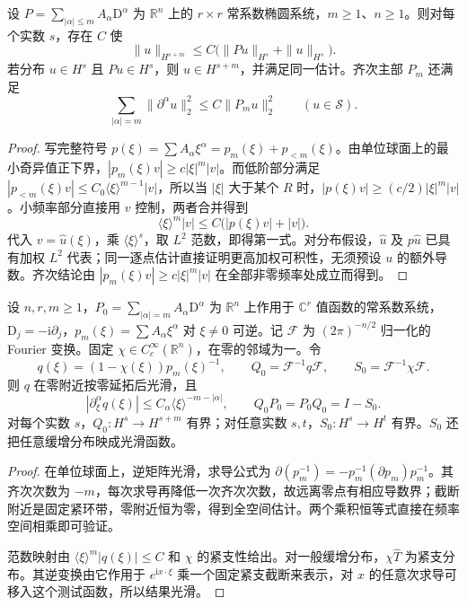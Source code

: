 \begin{theorem}\label{g3:thm:constant-elliptic-l2}
	设 \(P=\sum_{|\alpha|\le m}A_\alpha\mathrm D^\alpha\) 为 \(\mathbb R^n\) 上的 \(r\times r\) 常系数椭圆系统，\(m\ge1\)、\(n\ge1\)。则对每个实数 \(s\)，存在 \(C\) 使
	\begin{equation}\label{g3:eq:constant-elliptic-l2}
		\|u\|_{H^{s+m}}\le C\bigl(\|Pu\|_{H^s}+\|u\|_{H^s}\bigr).
	\end{equation}
	若分布 \(u\in H^s\) 且 \(Pu\in H^s\)，则 \(u\in H^{s+m}\)，并满足同一估计。齐次主部 \(P_m\) 还满足
	\[
		\sum_{|\alpha|=m}\|\partial^\alpha u\|_2^2\le C\|P_mu\|_2^2
		\qquad(u\in\mathcal S).
	\]
\end{theorem}
\begin{proof}
	写完整符号 \(p(\xi)=\sum A_\alpha\xi^\alpha=p_m(\xi)+p_{<m}(\xi)\)。由单位球面上的最小奇异值正下界，\(|p_m(\xi)v|\ge c|\xi|^m|v|\)。而低阶部分满足 \(|p_{<m}(\xi)v|\le C_0\langle\xi\rangle^{m-1}|v|\)，所以当 \(|\xi|\) 大于某个 \(R\) 时，\(|p(\xi)v|\ge(c/2)|\xi|^m|v|\)。小频率部分直接用 \(v\) 控制，两者合并得到
	\[
		\langle\xi\rangle^m|v|\le C\bigl(|p(\xi)v|+|v|\bigr).
	\]
	代入 \(v=\widehat u(\xi)\)，乘 \(\langle\xi\rangle^s\)，取 \(L^2\) 范数，即得第一式。对分布假设，\(\widehat u\) 及 \(p\widehat u\) 已具有加权 \(L^2\) 代表；同一逐点估计直接证明更高加权可积性，无须预设 \(u\) 的额外导数。齐次结论由 \(|p_m(\xi)v|\ge c|\xi|^m|v|\) 在全部非零频率处成立而得到。
\end{proof}

\begin{lemma}\label{g3:lem:constant-high-frequency-inverse}
	设 \(n,r,m\ge1\)，\(P_0=\sum_{|\alpha|=m}A_\alpha\mathrm D^\alpha\) 为 \(\mathbb R^n\) 上作用于 \(\mathbb C^r\) 值函数的常系数系统，\(\mathrm D_j=-\mathrm i\partial_j\)，\(p_m(\xi)=\sum A_\alpha\xi^\alpha\) 对 \(\xi\ne0\) 可逆。记 \(\mathcal F\) 为 \((2\pi)^{-n/2}\) 归一化的 Fourier 变换。固定 \(\chi\in C_c^\infty(\mathbb R^n)\)，在零的邻域为一。令
	\[
		q(\xi)=(1-\chi(\xi))p_m(\xi)^{-1},\qquad
		Q_0=\mathcal F^{-1}q\mathcal F,\qquad S_0=\mathcal F^{-1}\chi\mathcal F.
	\]
	则 \(q\) 在零附近按零延拓后光滑，且
	\[
		|\partial_\xi^\alpha q(\xi)|\le C_\alpha\langle\xi\rangle^{-m-|\alpha|},
		\qquad Q_0P_0=P_0Q_0=I-S_0.
	\]
	对每个实数 \(s\)，\(Q_0:H^s\to H^{s+m}\) 有界；对任意实数 \(s,t\)，\(S_0:H^s\to H^t\) 有界。\(S_0\) 还把任意缓增分布映成光滑函数。
\end{lemma}
\begin{proof}
	在单位球面上，逆矩阵光滑，求导公式为 \(\partial(p_m^{-1})=-p_m^{-1}(\partial p_m)p_m^{-1}\)。其齐次次数为 \(-m\)，每次求导再降低一次齐次次数，故远离零点有相应导数界；截断附近是固定紧环带，零附近恒为零，得到全空间估计。两个乘积恒等式直接在频率空间相乘即可验证。

	范数映射由 \(\langle\xi\rangle^m|q(\xi)|\le C\) 和 \(\chi\) 的紧支性给出。对一般缓增分布，\(\chi\widehat T\) 为紧支分布。其逆变换由它作用于 \(e^{\mathrm ix\cdot\xi}\) 乘一个固定紧支截断来表示，对 \(x\) 的任意次求导可移入这个测试函数，所以结果光滑。
\end{proof}

